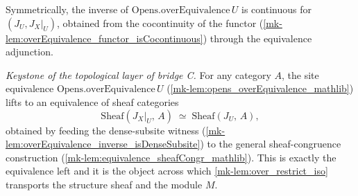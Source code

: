 \begin{lemma}\label{mk-lem:overEquivalence_inverse_isContinuous}
  \leanok

  Symmetrically, the inverse of \(\mathrm{Opens.overEquivalence}\,U\) is continuous for
  \((J_U, J_X|_U)\), obtained from the cocontinuity of the functor
  (\ref{mk-lem:overEquivalence_functor_isCocontinuous}) through the equivalence adjunction.
\end{lemma}

\begin{definition}\label{mk-def:overEquivalence_sheafCongr}
  \leanok

  \textit{Keystone of the topological layer of bridge C.}
  For any category \(A\), the site equivalence \(\mathrm{Opens.overEquivalence}\,U\)
  (\ref{mk-lem:opens_overEquivalence_mathlib}) lifts to an equivalence of sheaf categories
  \[
    \mathrm{Sheaf}(J_X|_U,\, A) \;\simeq\; \mathrm{Sheaf}(J_U,\, A),
  \]
  obtained by feeding the dense-subsite witness
  (\ref{mk-lem:overEquivalence_inverse_isDenseSubsite}) to the general sheaf-congruence
  construction (\ref{mk-lem:equivalence_sheafCongr_mathlib}). This is exactly the equivalence left
  and it is the object across which \ref{mk-lem:over_restrict_iso} transports the
  structure sheaf and the module \(M\).
\end{definition}


